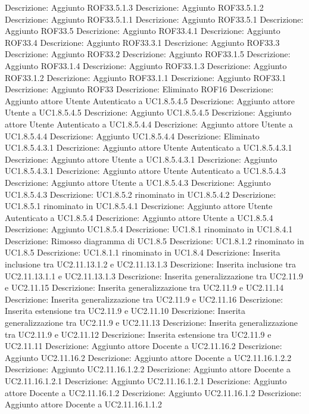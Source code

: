 Descrizione: Aggiunto ROF33.5.1.3 
Descrizione: Aggiunto ROF33.5.1.2 
Descrizione: Aggiunto ROF33.5.1.1 
Descrizione: Aggiunto ROF33.5.1 
Descrizione: Aggiunto ROF33.5 
Descrizione: Aggiunto ROF33.4.1 
Descrizione: Aggiunto ROF33.4 
Descrizione: Aggiunto ROF33.3.1 
Descrizione: Aggiunto ROF33.3 
Descrizione: Aggiunto ROF33.2 
Descrizione: Aggiunto ROF33.1.5 
Descrizione: Aggiunto ROF33.1.4 
Descrizione: Aggiunto ROF33.1.3 
Descrizione: Aggiunto ROF33.1.2 
Descrizione: Aggiunto ROF33.1.1 
Descrizione: Aggiunto ROF33.1 
Descrizione: Aggiunto ROF33 
Descrizione: Eliminato ROF16 
Descrizione: Aggiunto attore Utente Autenticato a UC1.8.5.4.5 
Descrizione: Aggiunto attore Utente a UC1.8.5.4.5 
Descrizione: Aggiunto UC1.8.5.4.5 
Descrizione: Aggiunto attore Utente Autenticato a UC1.8.5.4.4 
Descrizione: Aggiunto attore Utente a UC1.8.5.4.4 
Descrizione: Aggiunto UC1.8.5.4.4 
Descrizione: Eliminato UC1.8.5.4.3.1 
Descrizione: Aggiunto attore Utente Autenticato a UC1.8.5.4.3.1 
Descrizione: Aggiunto attore Utente a UC1.8.5.4.3.1 
Descrizione: Aggiunto UC1.8.5.4.3.1 
Descrizione: Aggiunto attore Utente Autenticato a UC1.8.5.4.3 
Descrizione: Aggiunto attore Utente a UC1.8.5.4.3 
Descrizione: Aggiunto UC1.8.5.4.3 
Descrizione: UC1.8.5.2 rinominato in UC1.8.5.4.2 
Descrizione: UC1.8.5.1 rinominato in UC1.8.5.4.1 
Descrizione: Aggiunto attore Utente Autenticato a UC1.8.5.4 
Descrizione: Aggiunto attore Utente a UC1.8.5.4 
Descrizione: Aggiunto UC1.8.5.4 
Descrizione: UC1.8.1 rinominato in UC1.8.4.1 
Descrizione: Rimosso diagramma di UC1.8.5 
Descrizione: UC1.8.1.2 rinominato in UC1.8.5 
Descrizione: UC1.8.1.1 rinominato in UC1.8.4 
Descrizione: Inserita inclusione tra UC2.11.13.1.2 e UC2.11.13.1.3 
Descrizione: Inserita inclusione tra UC2.11.13.1.1 e UC2.11.13.1.3 
Descrizione: Inserita generalizzazione tra UC2.11.9 e UC2.11.15 
Descrizione: Inserita generalizzazione tra UC2.11.9 e UC2.11.14 
Descrizione: Inserita generalizzazione tra UC2.11.9 e UC2.11.16 
Descrizione: Inserita estensione tra UC2.11.9 e UC2.11.10 
Descrizione: Inserita generalizzazione tra UC2.11.9 e UC2.11.13 
Descrizione: Inserita generalizzazione tra UC2.11.9 e UC2.11.12 
Descrizione: Inserita estensione tra UC2.11.9 e UC2.11.11 
Descrizione: Aggiunto attore Docente a UC2.11.16.2 
Descrizione: Aggiunto UC2.11.16.2 
Descrizione: Aggiunto attore Docente a UC2.11.16.1.2.2 
Descrizione: Aggiunto UC2.11.16.1.2.2 
Descrizione: Aggiunto attore Docente a UC2.11.16.1.2.1 
Descrizione: Aggiunto UC2.11.16.1.2.1 
Descrizione: Aggiunto attore Docente a UC2.11.16.1.2 
Descrizione: Aggiunto UC2.11.16.1.2 
Descrizione: Aggiunto attore Docente a UC2.11.16.1.1.2 
